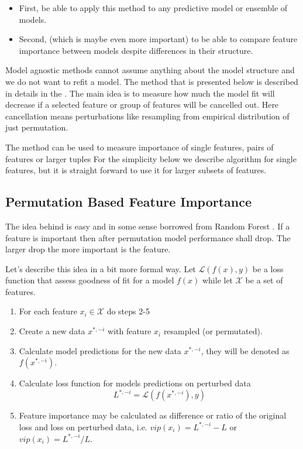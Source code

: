 \documentclass[]{krantz}
\providecommand{\tightlist}{%
  \setlength{\itemsep}{0pt}\setlength{\parskip}{0pt}}
\theoremstyle{definition}
\theoremstyle{definition}
\theoremstyle{definition}
\theoremstyle{remark}
\begin{document}
\begin{itemize}
\tightlist
\item
  First, be able to apply this method to any predictive model or
  ensemble of models.
\item
  Second, (which is maybe even more important) to be able to compare
  feature importance between models despite differences in their
  structure.
\end{itemize}

Model agnostic methods cannot assume anything about the model structure
and we do not want to refit a model. The method that is presented below
is described in details in the \citep{variableImportancePermutations}.
The main idea is to measure how much the model fit will decrease if a
selected feature or group of features will be cancelled out. Here
cancellation means perturbations like resampling from empirical
distribution of just permutation.

The method can be used to measure importance of single features, pairs
of features or larger tuples For the simplicity below we describe
algorithm for single features, but it is straight forward to use it for
larger subsets of features.

\hypertarget{permutation-based-feature-importance}{%
\subsection{Permutation Based Feature
Importance}\label{permutation-based-feature-importance}}

The idea behind is easy and in some sense borrowed from Random Forest
\citep{R-randomForest}. If a feature is important then after permutation
model performance shall drop. The larger drop the more important is the
feature.

Let's describe this idea in a bit more formal way. Let
\(\mathcal L(f(x), y)\) be a loss function that assess goodness of fit
for a model \(f(x)\) while let \(\mathcal X\) be a set of features.

\begin{enumerate}
\def\labelenumi{\arabic{enumi}.}
\tightlist
\item
  For each feature \(x_i \in \mathcal X\) do steps 2-5
\item
  Create a new data \(x^{*,-i}\) with feature \(x_i\) resampled (or
  permutated).
\item
  Calculate model predictions for the new data \(x^{*,-i}\), they will
  be denoted as \(f(x^{*,-i})\).
\item
  Calculate loss function for models predictions on perturbed data \[
  L^{*,-i} = \mathcal L(f(x^{*,-i}), y)
  \]
\item
  Feature importance may be calculated as difference or ratio of the
  original loss and loss on perturbed data, i.e.
  \(vip(x_i) = L^{*,-i} - L\) or \(vip(x_i) = L^{*,-i} / L\).
\end{enumerate}
\end{document}
